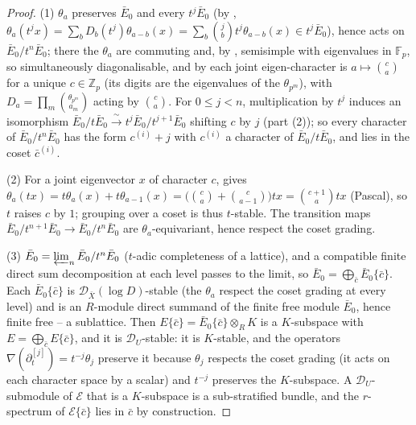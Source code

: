 \documentclass[11pt,reqno]{amsart}
\newcommand{\Zp}{\mathbb{Z}_p}
\newcommand{\Fp}{\mathbb{F}_p}
\newcommand{\cD}{\mathcal{D}}
\newcommand{\cE}{\mathcal{E}}
\newcommand{\isoto}{\xrightarrow{\ \sim\ }}
\theoremstyle{plain}
\theoremstyle{definition}
\theoremstyle{remark}
\numberwithin{equation}{section}
\begin{document}
\begin{proof}
(1) $\theta_a$ preserves $\bar E_0$ and every $t^j\bar E_0$ (by
, $\theta_a(t^jx)=\sum_bD_b(t^j)\theta_{a-b}(x)
=\sum_b\binom jb t^j\theta_{a-b}(x)\in t^j\bar E_0$), hence acts on
$\bar E_0/t^n\bar E_0$; there the
$\theta_a$ are commuting and, by , semisimple with
eigenvalues in $\Fp$, so simultaneously diagonalisable, and by
 each joint eigen-character is $a\mapsto\binom ca$ for a
unique $c\in\Zp$ (its digits are the eigenvalues of the
$\theta_{p^m}$), with $D_a=\prod_m\binom{\theta_{p^m}}{a_m}$ acting by
$\binom ca$.  For $0\le j<n$, multiplication by $t^j$ induces an
isomorphism $\bar E_0/t\bar E_0\isoto t^j\bar E_0/t^{j+1}\bar E_0$
shifting $c$ by $j$ (part (2)); so every character of
$\bar E_0/t^n\bar E_0$ has the form $c^{(i)}+j$ with $c^{(i)}$ a
character of $\bar E_0/t\bar E_0$, and lies in the coset $\bar c^{(i)}$.

(2) For a joint eigenvector $x$ of character $c$, 
gives $\theta_a(tx)=t\theta_a(x)+t\theta_{a-1}(x)
=\bigl(\binom ca+\binom c{a-1}\bigr)tx=\binom{c+1}{a}tx$ (Pascal), so
$t$ raises $c$ by $1$; grouping over a coset is thus $t$-stable.  The
transition maps $\bar E_0/t^{n+1}\bar E_0\to\bar E_0/t^n\bar E_0$ are
$\theta_a$-equivariant, hence respect the coset grading.

(3) $\bar E_0=\varprojlim_n\bar E_0/t^n\bar E_0$ ($t$-adic completeness of
a lattice), and a compatible finite direct sum decomposition at each
level passes to the limit, so
$\bar E_0=\bigoplus_{\bar c}\bar E_0\{\bar c\}$.  Each
$\bar E_0\{\bar c\}$ is $\cD_{\bar X}(\log D)$-stable (the $\theta_a$
respect the coset grading at every level) and is an $R$-module direct
summand of the finite free module $\bar E_0$, hence finite free -- a
sublattice.  Then $E\{\bar c\}=\bar E_0\{\bar c\}\otimes_RK$ is a
$K$-subspace with $E=\bigoplus_{\bar c}E\{\bar c\}$, and it is
$\cD_U$-stable: it is $K$-stable, and the operators
$\nabla(\partial_t^{[j]})=t^{-j}\theta_j$ preserve it because $\theta_j$
respects the coset grading (it acts on each character space by a scalar)
and $t^{-j}$ preserves the $K$-subspace.  A $\cD_U$-submodule of $\cE$
that is a $K$-subspace is a sub-stratified bundle, and the $r$-spectrum of
$\cE\{\bar c\}$ lies in $\bar c$ by construction.


\end{proof}
\end{document}
